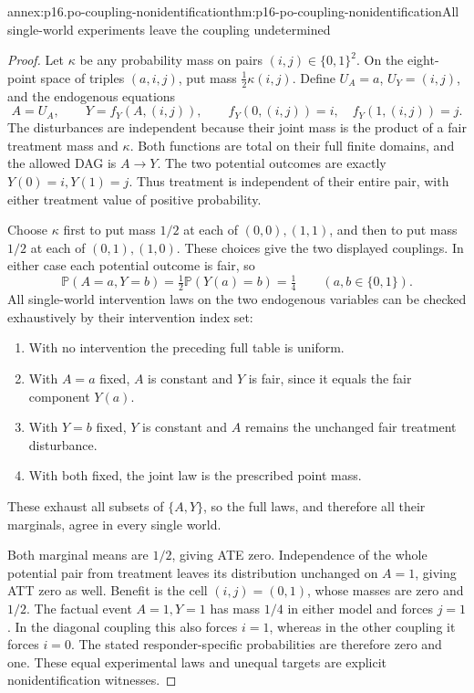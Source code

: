 \begin{annexitem}{annex:p16.po-coupling-nonidentification}{thm:p16-po-coupling-nonidentification}{All single-world experiments leave the coupling undetermined}
\begin{proof}
Let \(\kappa\) be any probability mass on pairs
\((i,j)\in\{0,1\}^2\). On the eight-point space of triples
\((a,i,j)\), put mass \(\frac12\kappa(i,j)\). Define
\(U_A=a\), \(U_Y=(i,j)\), and the endogenous equations
\[
 A=U_A,\qquad
 Y=f_Y(A,(i,j)),\qquad
 f_Y(0,(i,j))=i,\quad f_Y(1,(i,j))=j.
\]
The disturbances are independent because their joint mass is the
product of a fair treatment mass and \(\kappa\). Both functions
are total on their full finite domains, and the allowed DAG is
\(A\to Y\). The two potential outcomes are exactly
\(Y(0)=i,Y(1)=j\). Thus treatment is independent of their
entire pair, with either treatment value of positive probability.

Choose \(\kappa\) first to put mass \(1/2\) at each of
\((0,0),(1,1)\), and then to put mass \(1/2\) at each of
\((0,1),(1,0)\). These choices give the two displayed couplings.
In either case each potential outcome is fair, so
\[
 \mathbb P(A=a,Y=b)=\tfrac12\mathbb P(Y(a)=b)=\tfrac14
 \qquad(a,b\in\{0,1\}).
\]
All single-world intervention laws on the two endogenous variables
can be checked exhaustively by their intervention index set:
\begin{enumerate}
\item With no intervention the preceding full table is uniform.
\item With \(A=a\) fixed, \(A\) is constant and \(Y\) is fair,
      since it equals the fair component \(Y(a)\).
\item With \(Y=b\) fixed, \(Y\) is constant and \(A\) remains
      the unchanged fair treatment disturbance.
\item With both fixed, the joint law is the prescribed point mass.
\end{enumerate}
These exhaust all subsets of \(\{A,Y\}\), so the full laws,
and therefore all their marginals, agree in every single world.

Both marginal means are \(1/2\), giving ATE zero. Independence
of the whole potential pair from treatment leaves its distribution
unchanged on \(A=1\), giving ATT zero as well. Benefit is the
cell \((i,j)=(0,1)\), whose masses are zero and \(1/2\).
The factual event \(A=1,Y=1\) has mass \(1/4\) in either
model and forces \(j=1\). In the diagonal coupling this also
forces \(i=1\), whereas in the other coupling it forces \(i=0\).
The stated responder-specific probabilities are therefore zero and
one. These equal experimental laws and unequal targets are explicit
nonidentification witnesses.


\end{proof}
\end{annexitem}
